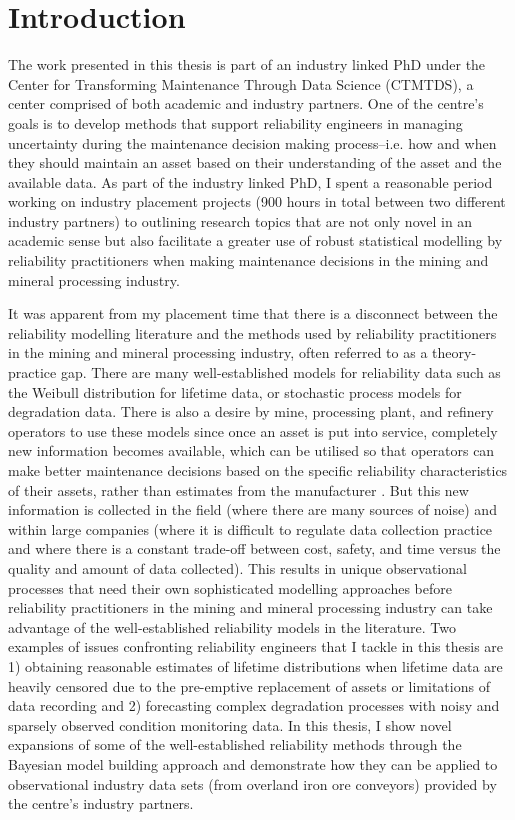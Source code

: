 \chapter{Introduction}\label{chap:chapter1}

The work presented in this thesis is part of an industry linked PhD under the Center for Transforming Maintenance Through Data Science (CTMTDS), a center comprised of both academic and industry partners. One of the centre's goals is to develop methods that support reliability engineers in managing uncertainty during the maintenance decision making process--i.e. how and when they should maintain an asset based on their understanding of the asset and the available data. As part of the industry linked PhD, I spent a reasonable period working on industry placement projects (900 hours in total between two different industry partners) to outlining research topics that are not only novel in an academic sense but also facilitate a greater use of robust statistical modelling by reliability practitioners when making maintenance decisions in the mining and mineral processing industry.

It was apparent from my placement time that there is a disconnect between the reliability modelling literature and the methods used by reliability practitioners in the mining and mineral processing industry, often referred to as a theory-practice gap. There are many well-established models for reliability data such as the Weibull distribution for lifetime data, or stochastic process models for degradation data. There is also a desire by mine, processing plant, and refinery operators to use these models since once an asset is put into service, completely new information becomes available, which can be utilised so that operators can make better maintenance decisions based on the specific reliability characteristics of their assets, rather than estimates from the manufacturer \citep{jardine2013}. But this new information is collected in the field (where there are many sources of noise) and within large companies (where it is difficult to regulate data collection practice and where there is a constant trade-off between cost, safety, and time versus the quality and amount of data collected). This results in unique observational processes that need their own sophisticated modelling approaches before reliability practitioners in the mining and mineral processing industry can take advantage of the well-established reliability models in the literature. Two examples of issues confronting reliability engineers that I tackle in this thesis are 1) obtaining reasonable estimates of lifetime distributions when lifetime data are heavily censored due to the pre-emptive replacement of assets or limitations of data recording and 2) forecasting complex degradation processes with noisy and sparsely observed condition monitoring data. In this thesis, I show novel expansions of some of the well-established reliability methods through the Bayesian model building approach \citep{gelman_workflow_2020} and demonstrate how they can be applied to observational industry data sets (from overland iron ore conveyors) provided by the centre's industry partners.

